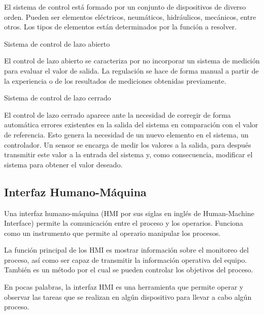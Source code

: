 El sistema de control está formado por un conjunto de dispositivos de diverso orden. Pueden ser elementos eléctricos, neumáticos, hidráulicos, mecánicos, entre otros. Los tipos de elementos están determinados por la función a resolver. \cite{SCONT2020} 

Sistema de control de lazo abierto 

El control de lazo abierto se caracteriza por no incorporar un sistema de medición para evaluar el valor de salida. La regulación se hace de forma manual a partir de la experiencia o de los resultados de mediciones obtenidas previamente. \cite{SINADRIVES}

Sistema de control de lazo cerrado

El control de lazo cerrado aparece ante la necesidad de corregir de forma automática errores existentes en la salida del sistema en comparación con el valor de referencia. Esto genera la necesidad de un nuevo elemento en el sistema, un controlador. Un sensor se encarga de medir los valores a la salida, para después transmitir este valor a la entrada del sistema y, como consecuencia, modificar el sistema para obtener el valor deseado. \cite{SINADRIVES} 

\subsection{Interfaz Humano-Máquina}

Una interfaz humano-máquina (HMI por sus siglas en inglés de Human-Machine Interface) permite la comunicación entre el proceso y los operarios. Funciona como un instrumento que permite al operario manipular los procesos.

La función principal de los HMI es mostrar información sobre el monitoreo del proceso, así como ser capaz de transmitir la información operativa del equipo. También es un método por el cual se pueden controlar los objetivos del proceso.

En pocas palabras, la interfaz HMI es una herramienta que permite operar y observar las tareas que se realizan en algún dispositivo para llevar a cabo algún proceso. \cite{IHM2020}

\newpage